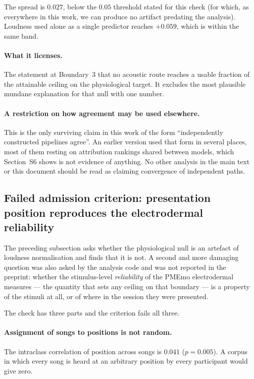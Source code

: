 The spread is $0.027$, below the $0.05$ threshold stated for this check (for which, as everywhere in this work, we can produce no artifact predating the analysis). Loudness used alone as a single
predictor reaches $+0.059$, which is within the same band.

\paragraph{What it licenses.}
The statement at Boundary~3 that no acoustic route reaches a usable fraction of the
attainable ceiling on the physiological target. It excludes the most plausible mundane
explanation for that null with one number.

\paragraph{A restriction on how agreement may be used elsewhere.}
This is the only surviving claim in this work of the form ``independently constructed
pipelines agree''. An earlier version used that form in several places, most of them
resting on attribution rankings shared between models, which Section~S6 shows is not
evidence of anything. No other analysis in the main text or this document should be
read as claiming convergence of independent paths.

\subsection{Failed admission criterion: presentation position reproduces the
electrodermal reliability}
\label{sec:order}

The preceding subsection asks whether the physiological null is an artefact of
loudness normalisation and finds that it is not. A second and more damaging
question was also asked by the analysis code and was not reported in the
preprint: whether the stimulus-level \emph{reliability} of the PMEmo
electrodermal measures --- the quantity that sets any ceiling on that
boundary --- is a property of the stimuli at all, or of where in the session
they were presented.

The check has three parts and the criterion fails all three.

\paragraph{Assignment of songs to positions is not random.}
The intraclass correlation of position across songs is $0.041$
($p = 0.005$). A corpus in which every song is heard at an arbitrary position
by every participant would give zero.

